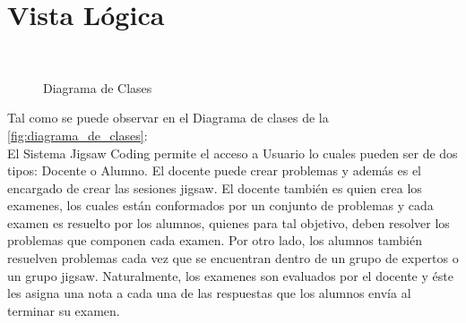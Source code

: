 \section{Vista Lógica}
\begin{figure}[!h]
	\centering
	\\
	\caption{Diagrama de Clases}\label{fig:diagrama_de_clases}
\end{figure}
Tal como se puede observar en el Diagrama de clases de la \autoref{fig:diagrama_de_clases}:\\

El Sistema Jigsaw Coding permite el acceso a Usuario lo cuales pueden ser de dos tipos: Docente o Alumno. El docente puede crear problemas y además es el encargado de crear las sesiones jigsaw. El docente también es quien crea los examenes, los cuales están conformados por un conjunto de problemas y cada examen es resuelto por los alumnos, quienes para tal objetivo, deben resolver los problemas que componen cada examen. Por otro lado, los alumnos también resuelven problemas cada vez que se encuentran dentro de un grupo de expertos o un grupo jigsaw. Naturalmente, los examenes son evaluados por el docente y éste les asigna una nota a cada una de las respuestas que los alumnos envía al terminar su examen.
\clearpage
